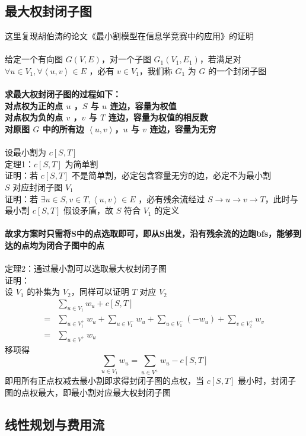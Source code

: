 	\subsection{最大权封闭子图}
	这里复现胡伯涛的论文《最小割模型在信息学竞赛中的应用》的证明\\
	\\
	给定一个有向图 $G(V,E)$，对一个子图 $G_1(V_1,E_1)$，若满足对 $\forall u \in V_1,\forall \left< u,v\right>\in E$ ，必有 $v\in V_1$，我们称 $G_1$ 为 $G$ 的一个封闭子图\\
	\\
	\textbf{求最大权封闭子图的过程如下：\\
		对点权为正的点 $u$ ，$S$ 与 $u$ 连边，容量为权值\\
		对点权为负的点 $v$ ，$v$ 与 $T$ 连边，容量为权值的相反数\\
		对原图 $G$ 中的所有边 $\left<u,v\right>$，$u$ 与 $v$ 连边，容量为无穷\\}\\
	设最小割为 $c[S,T]$\\
	定理1：$c[S,T]$ 为简单割\\
	证明：若 $c[S,T]$ 不是简单割，必定包含容量无穷的边，必定不为最小割\\
	$S$ 对应封闭子图 $V_1$\\
	证明：若 $\exists u\in S,v\in T,\left<u,v\right>\in E$ ，必有残余流经过 $S\rightarrow u\rightarrow v\rightarrow T$，此时与最小割 $c[S,T]$ 假设矛盾，故 $S$ 符合 $V_1$ 的定义\\
	\\
	\textbf{故求方案时只需将S中的点选取即可，即从S出发，沿有残余流的边跑bfs，能够到达的点均为闭合子图中的点\\}\\
	定理2：通过最小割可以选取最大权封闭子图\\
	证明：\\
	设 $V_1$ 的补集为 $V_2$，同样可以证明 $T$ 对应 $V_2$\\
	$$
	\begin{aligned}
	&\sum_{u\in V_1}w_u+c[S,T]
	\\=&\sum_{u\in V_1^+}w_u+\sum_{u\in V_1^-}w_u+\sum_{u\in V_1^-}(-w_u)+\sum_{v \in V_2^+}w_v
	\\=&\sum_{u\in V^+}w_u
	\end{aligned}
	$$
	移项得\\
	$$
	\sum_{u\in V_1}w_u= \sum_{u\in V^+}w_u-c[S,T]
	$$
	即用所有正点权减去最小割即求得封闭子图的点权，当 $c[S,T]$ 最小时，封闭子图的点权最大，即最小割对应最大权封闭子图
	\newpage
	\subsection{线性规划与费用流}~
	
